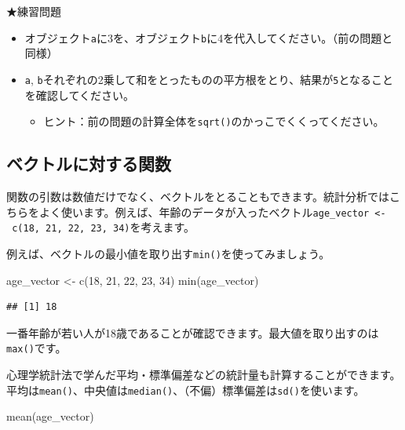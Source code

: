\documentclass[
]{book}
\newenvironment{Shaded}{\begin{snugshade}}{\end{snugshade}}
\newcommand{\DecValTok}[1]{\textcolor[rgb]{0.00,0.00,0.81}{#1}}
\newcommand{\FunctionTok}[1]{\textcolor[rgb]{0.00,0.00,0.00}{#1}}
\newcommand{\NormalTok}[1]{#1}
\newcommand{\OtherTok}[1]{\textcolor[rgb]{0.56,0.35,0.01}{#1}}
\providecommand{\tightlist}{%
  \setlength{\itemsep}{0pt}\setlength{\parskip}{0pt}}
\begin{document}
★練習問題

\begin{itemize}
\tightlist
\item
  オブジェクト\texttt{a}に3を、オブジェクト\texttt{b}に4を代入してください。（前の問題と同様）
\item
  \texttt{a}, \texttt{b}それぞれの2乗して和をとったものの平方根をとり、結果が\texttt{5}となることを確認してください。

  \begin{itemize}
  \tightlist
  \item
    ヒント：前の問題の計算全体を\texttt{sqrt()}のかっこでくくってください。
  \end{itemize}
\end{itemize}

\hypertarget{ux30d9ux30afux30c8ux30ebux306bux5bfeux3059ux308bux95a2ux6570}{%
\subsection{ベクトルに対する関数}\label{ux30d9ux30afux30c8ux30ebux306bux5bfeux3059ux308bux95a2ux6570}}

関数の引数は数値だけでなく、ベクトルをとることもできます。統計分析ではこちらをよく使います。例えば、年齢のデータが入ったベクトル\texttt{age\_vector\ \textless{}-\ c(18,\ 21,\ 22,\ 23,\ 34)}を考えます。

例えば、ベクトルの最小値を取り出す\texttt{min()}を使ってみましょう。

\begin{Shaded}
\begin{Highlighting}[]
\NormalTok{age\_vector }\OtherTok{\textless{}{-}} \FunctionTok{c}\NormalTok{(}\DecValTok{18}\NormalTok{, }\DecValTok{21}\NormalTok{, }\DecValTok{22}\NormalTok{, }\DecValTok{23}\NormalTok{, }\DecValTok{34}\NormalTok{)}
\FunctionTok{min}\NormalTok{(age\_vector)}
\end{Highlighting}
\end{Shaded}

\begin{verbatim}
## [1] 18
\end{verbatim}

一番年齢が若い人が18歳であることが確認できます。最大値を取り出すのは\texttt{max()}です。

心理学統計法で学んだ平均・標準偏差などの統計量も計算することができます。平均は\texttt{mean()}、中央値は\texttt{median()}、（不偏）標準偏差は\texttt{sd()}を使います。

\begin{Shaded}
\begin{Highlighting}[]
\FunctionTok{mean}\NormalTok{(age\_vector)}
\end{Highlighting}
\end{Shaded}
\end{document}
